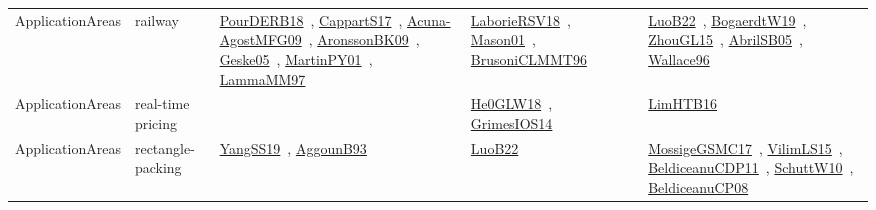 {\begin{longtable}{lp{3cm}>{\raggedright\arraybackslash}p{6cm}>{\raggedright\arraybackslash}p{6cm}>{\raggedright\arraybackslash}p{8cm}}
ApplicationAreas & railway & \href{articles/PourDERB18.pdf}{PourDERB18}~\cite{PourDERB18}, \href{papers/CappartS17.pdf}{CappartS17}~\cite{CappartS17}, \href{papers/Acuna-AgostMFG09.pdf}{Acuna-AgostMFG09}~\cite{Acuna-AgostMFG09}, \href{papers/AronssonBK09.pdf}{AronssonBK09}~\cite{AronssonBK09}, \href{papers/Geske05.pdf}{Geske05}~\cite{Geske05}, \href{articles/MartinPY01.pdf}{MartinPY01}~\cite{MartinPY01}, \href{articles/LammaMM97.pdf}{LammaMM97}~\cite{LammaMM97} & \href{articles/LaborieRSV18.pdf}{LaborieRSV18}~\cite{LaborieRSV18}, \href{articles/Mason01.pdf}{Mason01}~\cite{Mason01}, \href{papers/BrusoniCLMMT96.pdf}{BrusoniCLMMT96}~\cite{BrusoniCLMMT96} & \href{papers/LuoB22.pdf}{LuoB22}~\cite{LuoB22}, \href{papers/BogaerdtW19.pdf}{BogaerdtW19}~\cite{BogaerdtW19}, \href{papers/ZhouGL15.pdf}{ZhouGL15}~\cite{ZhouGL15}, \href{papers/AbrilSB05.pdf}{AbrilSB05}~\cite{AbrilSB05}, \href{articles/Wallace96.pdf}{Wallace96}~\cite{Wallace96}\\
ApplicationAreas & real-time pricing &  & \href{papers/He0GLW18.pdf}{He0GLW18}~\cite{He0GLW18}, \href{articles/GrimesIOS14.pdf}{GrimesIOS14}~\cite{GrimesIOS14} & \href{papers/LimHTB16.pdf}{LimHTB16}~\cite{LimHTB16}\\
ApplicationAreas & rectangle-packing & \href{papers/YangSS19.pdf}{YangSS19}~\cite{YangSS19}, \href{articles/AggounB93.pdf}{AggounB93}~\cite{AggounB93} & \href{papers/LuoB22.pdf}{LuoB22}~\cite{LuoB22} & \href{papers/MossigeGSMC17.pdf}{MossigeGSMC17}~\cite{MossigeGSMC17}, \href{papers/VilimLS15.pdf}{VilimLS15}~\cite{VilimLS15}, \href{articles/BeldiceanuCDP11.pdf}{BeldiceanuCDP11}~\cite{BeldiceanuCDP11}, \href{papers/SchuttW10.pdf}{SchuttW10}~\cite{SchuttW10}, \href{papers/BeldiceanuCP08.pdf}{BeldiceanuCP08}~\cite{BeldiceanuCP08}\\

\end{longtable}}

